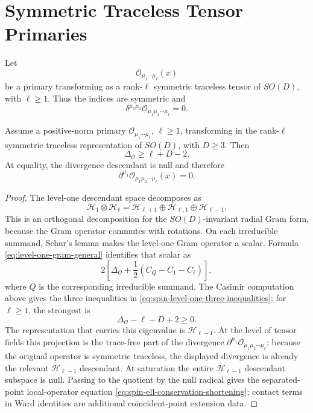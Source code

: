 \section{Symmetric Traceless Tensor Primaries}

Let
\[
  \mathcal O_{\mu_1\cdots\mu_\ell}(x)
\]
be a primary transforming as a rank-\(\ell\) symmetric traceless tensor of
\(SO(D)\), with \(\ell\ge1\).  Thus the indices are symmetric and
\[
  \delta^{\mu_1\mu_2}
  \mathcal O_{\mu_1\mu_2\cdots\mu_\ell}=0.
\]
\begin{theorem}
\label{thm:stt-unitarity-bound-shortening}
Assume a positive-norm primary
\(\mathcal O_{\mu_1\cdots\mu_\ell}\), \(\ell\ge1\), transforming in the
rank-\(\ell\) symmetric traceless representation of \(SO(D)\), with \(D\ge3\).
Then
\begin{equation}
  \Delta_{\mathcal O}\ge \ell+D-2.
  \label{eq:spin-ell-unitarity-bound}
\end{equation}
At equality, the divergence descendant is null and therefore
\begin{equation}
  \partial^{\mu_1}
  \mathcal O_{\mu_1\mu_2\cdots\mu_\ell}(x)=0.
  \label{eq:spin-ell-conservation-shortening}
\end{equation}
\end{theorem}

\begin{proof}
The level-one descendant space decomposes as
\[
  \mathcal H_1\otimes\mathcal H_\ell
  =
  \mathcal H_{\ell+1}\oplus\mathcal H_{\ell,1}\oplus\mathcal H_{\ell-1}.
\]
This is an orthogonal decomposition for the \(SO(D)\)-invariant radial Gram
form, because the Gram operator commutes with rotations.  On each irreducible
summand, Schur's lemma makes the level-one Gram operator a scalar.  Formula
\eqref{eq:level-one-gram-general} identifies that scalar as
\[
  2\left[
  \Delta_{\mathcal O}
  +\frac12(C_Q-C_1-C_\ell)
  \right],
\]
where \(Q\) is the corresponding irreducible summand.  The Casimir computation
above gives the three inequalities in
\eqref{eq:spin-level-one-three-inequalities}; for \(\ell\ge1\), the strongest
is
\[
  \Delta_{\mathcal O}-\ell-D+2\ge0.
\]
The representation that carries this eigenvalue is
\(\mathcal H_{\ell-1}\).  At the level of tensor fields this projection is
the trace-free part of the divergence
\(\partial^{\mu_1}\mathcal O_{\mu_1\mu_2\cdots\mu_\ell}\); because the
original operator is symmetric traceless, the displayed divergence is already
the relevant \(\mathcal H_{\ell-1}\) descendant.  At saturation the entire
\(\mathcal H_{\ell-1}\) descendant subspace is null.  Passing to the quotient
by the null radical gives the separated-point local-operator equation
\eqref{eq:spin-ell-conservation-shortening}; contact terms in Ward identities
are additional coincident-point extension data.
\end{proof}

